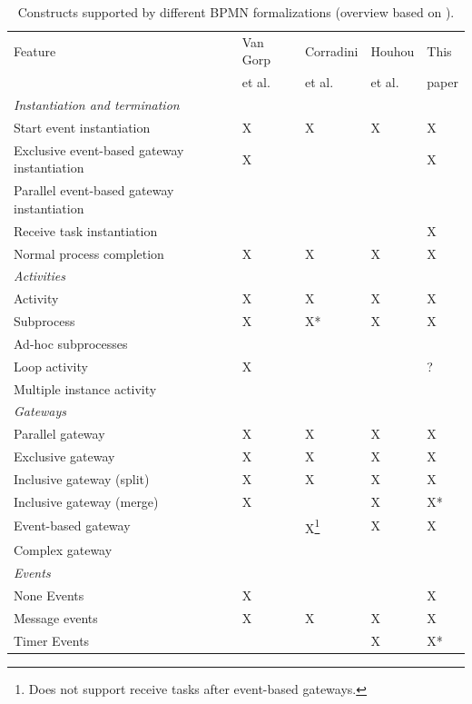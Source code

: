 \documentclass[adraft, copyright, creativecommons]{eptcs} %
\begin{document}
\begin{table}[htbp]
    \caption{Constructs supported by different BPMN formalizations (overview based on \cite{vangorpVisualTokenbasedFormalization2013}).}
    \label{tab:supportedconstructs}
    \begin{tabular}{l l l l l}
    \hline
      Feature & Van Gorp &  Corradini & Houhou & This\\
      & et al. \cite{vangorpVisualTokenbasedFormalization2013} & et al. \cite{corradiniFormalApproachAnalysis2021}& et al. \cite{houhouFirstOrderLogicVerification2022} & paper\\
      \hline
      \textit{Instantiation and termination} & &\\
      Start event instantiation & X & X & X & X\\
      Exclusive event-based gateway instantiation & X & & & X\\
      Parallel event-based gateway instantiation &  & & & \\
      Receive task instantiation & & & & X\\
      Normal process completion & X & X & X & X\\
      \textit{Activities} & & & &\\
      Activity & X & X & X & X\\
      Subprocess & X & X* & X & X\\
      Ad-hoc subprocesses & & & &\\
      Loop activity & X & & & ?\\
      Multiple instance activity & & & & \\
      \textit{Gateways} & & & &\\
      Parallel gateway & X & X & X & X\\
      Exclusive gateway & X & X & X & X\\
      Inclusive gateway (split) & X & X & X & X\\
      Inclusive gateway (merge) & X & & X & X*\\
      Event-based gateway &  & X\footnote{Does not support receive tasks after event-based gateways.} & X & X\\ %
      Complex gateway & & & &\\
      \textit{Events} & & & & \\
      None Events & X & & & X\\
      Message events & X & X & X & X\\
      Timer Events & & & X & X*\\

\end{tabular}
\end{table}
\end{document}
